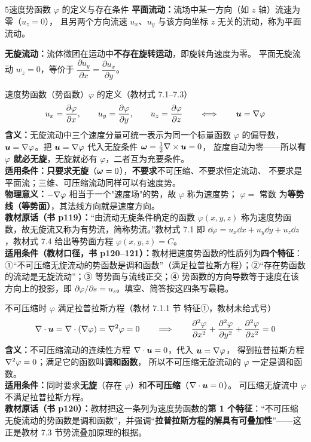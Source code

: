 \begin{kaodian}{5}{速度势函数 $\varphi$ 的定义与存在条件}
\textbf{平面流动：}流场中某一方向（如 $z$ 轴）流速为零（$u_z=0$），
且另两个方向流速 $u_x$、$u_y$ 与该方向坐标 $z$ 无关的流动，称为平面流动。

\textbf{无旋流动：}流体微团在运动中\textbf{不存在旋转运动}，即旋转角速度为零。
平面无旋流动 $w_z=0$，等价于 $\dfrac{\partial u_y}{\partial x}=\dfrac{\partial u_x}{\partial y}$。

\begin{gongshi}{速度势函数（势函数）$\varphi$ 的定义（教材式 7.1--7.3）}
\[ u_x=\frac{\partial\varphi}{\partial x},\qquad u_y=\frac{\partial\varphi}{\partial y},\qquad u_z=\frac{\partial\varphi}{\partial z}
   \qquad\Longleftrightarrow\qquad \bm{u}=\nabla\varphi \]
\textbf{含义：}无旋流动中三个速度分量可统一表示为同一个标量函数 $\varphi$ 的偏导数，
$\bm{u}=\nabla\varphi$。把 $\bm{u}=\nabla\varphi$ 代入无旋条件 $\bm{\omega}=\frac12\nabla\times\bm{u}=0$，
旋度自动为零——所以\textbf{有 $\varphi$ 就必无旋}，无旋就必有 $\varphi$，二者互为充要条件。\\
\textbf{适用条件：}\textbf{只要求无旋}（$\bm{\omega}=0$），\textbf{不要求}不可压缩、不要求恒定流动、
不要求是平面流；三维、可压缩流动同样可以有速度势。\\
\textbf{物理意义：}$-\nabla\varphi$ 相当于一个"速度场"的势，故 $\varphi$ 称为速度势；
$\varphi=$ 常数 为\textbf{等势线（等势面）}，其法线方向就是速度方向。\\
\textbf{教材原话（书 p119）：}“由流动无旋条件确定的函数 $\varphi(x,y,z)$ 称为速度势函数，故无旋流又称为有势流，简称势流。”教材式 7.1 即 $\dd\varphi=u_x\dd x+u_y\dd y+u_z\dd z$，教材式 7.4 给出等势面方程 $\varphi(x,y,z)=C$。\\
\textbf{适用条件（教材口径，书 p120--121）：}教材把速度势函数的性质列为\textbf{四个特征}：①“不可压缩无旋流动的势函数是调和函数”（满足拉普拉斯方程）；②“存在势函数的流动是无旋流动”；③ 等势面与流线正交；④ 势函数的方向导数等于速度在该方向上的投影，即 $\partial\varphi/\partial s=u_s$。填空、简答按这四条写最稳。
\end{gongshi}

\begin{gongshi}{不可压缩时 $\varphi$ 满足拉普拉斯方程（教材 7.1.1 节 特征①，教材未给式号）}
\[ \nabla\cdot\bm{u}=\nabla\cdot(\nabla\varphi)=\nabla^2\varphi=0 \qquad\Longrightarrow\qquad
   \frac{\partial^2\varphi}{\partial x^2}+\frac{\partial^2\varphi}{\partial y^2}+\frac{\partial^2\varphi}{\partial z^2}=0 \]
\textbf{含义：}不可压缩流动的连续性方程 $\nabla\cdot\bm{u}=0$，代入 $\bm{u}=\nabla\varphi$，
得到拉普拉斯方程 $\nabla^2\varphi=0$；满足它的函数叫\textbf{调和函数}，
所以不可压缩无旋流动的 $\varphi$ 一定是调和函数。\\
\textbf{适用条件：}同时要求\textbf{无旋}（存在 $\varphi$）和\textbf{不可压缩}（$\nabla\cdot\bm{u}=0$）。
可压缩无旋流中 $\varphi$ 不满足拉普拉斯方程。\\
\textbf{教材原话（书 p120）：}教材把这一条列为速度势函数的\textbf{第 1 个特征}：“不可压缩无旋流动的势函数是调和函数”，并强调“\textbf{拉普拉斯方程的解具有可叠加性}”——这正是教材 7.3 节势流叠加原理的根据。
\end{gongshi}


\end{kaodian}
